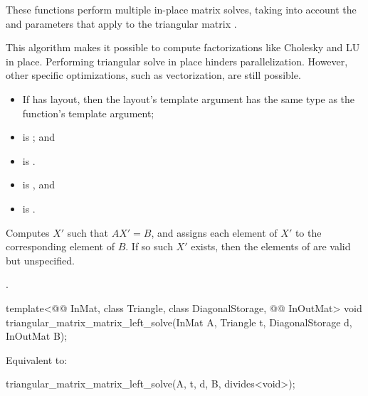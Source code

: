 \begin{itemdescr}
\pnum
These functions perform multiple in-place matrix solves,
taking into account the  and  parameters
that apply to the triangular matrix .
\begin{note}
This algorithm makes it possible
to compute factorizations like Cholesky and LU in place.
Performing triangular solve in place hinders parallelization.
However, other  specific optimizations,
such as vectorization, are still possible.
\end{note}

\pnum
\mandates
\begin{itemize}
\item
If  has  layout,
then the layout's  template argument has
the same type as the function's  template argument;
\item
{}
is ; and
\item
{}
is .
\end{itemize}

\pnum
\expects
\begin{itemize}
\item
{} is , and
\item
{} is .
\end{itemize}

\pnum
\effects
Computes $X'$ such that $AX' = B$,
and assigns each element of $X'$ to the corresponding element of $B$.
If so such $X'$ exists,
then the elements of  are valid but unspecified.

\pnum
\complexity
{}.
\end{itemdescr}

\begin{itemdecl}
template<@@ InMat, class Triangle, class DiagonalStorage, @@ InOutMat>
  void triangular_matrix_matrix_left_solve(InMat A, Triangle t, DiagonalStorage d,
                                           InOutMat B);
\end{itemdecl}

\begin{itemdescr}
\pnum
\effects
Equivalent to:
\begin{codeblock}
triangular_matrix_matrix_left_solve(A, t, d, B, divides<void>{});
\end{codeblock}
\end{itemdescr}

